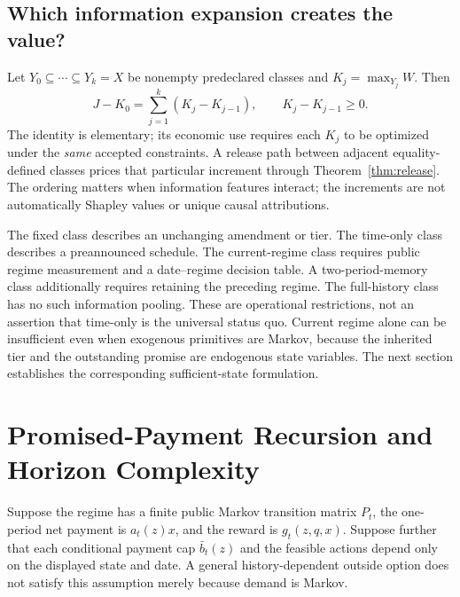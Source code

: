\subsection{Which information expansion creates the value?}
Let $Y_0\subseteq\cdots\subseteq Y_k=X$ be nonempty predeclared classes and $K_j=\max_{Y_j}W$. Then
\begin{equation}\label{eq:hierarchy}
 J-K_0=\sum_{j=1}^k(K_j-K_{j-1}),\qquad K_j-K_{j-1}\geq0.
\end{equation}
The identity is elementary; its economic use requires each $K_j$ to be optimized under the \emph{same} accepted constraints. A release path between adjacent equality-defined classes prices that particular increment through Theorem~\ref{thm:release}. The ordering matters when information features interact; the increments are not automatically Shapley values or unique causal attributions.

The fixed class describes an unchanging amendment or tier. The time-only class describes a preannounced schedule. The current-regime class requires public regime measurement and a date--regime decision table. A two-period-memory class additionally requires retaining the preceding regime. The full-history class has no such information pooling. These are operational restrictions, not an assertion that time-only is the universal status quo. Current regime alone can be insufficient even when exogenous primitives are Markov, because the inherited tier and the outstanding promise are endogenous state variables. The next section establishes the corresponding sufficient-state formulation.

\section{Promised-Payment Recursion and Horizon Complexity}\label{sec:recursion}
Suppose the regime has a finite public Markov transition matrix $P_t$, the one-period net payment is $a_t(z)x$, and the reward is $g_t(z,q,x)$. Suppose further that each conditional payment cap $\bar b_t(z)$ and the feasible actions depend only on the displayed state and date. A general history-dependent outside option does not satisfy this assumption merely because demand is Markov.

